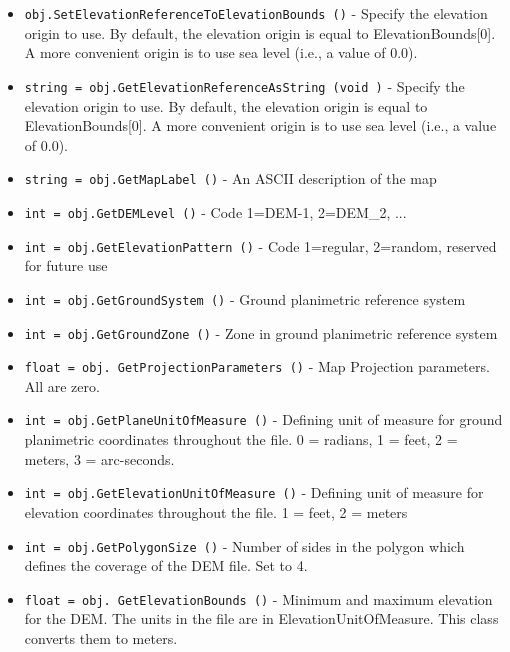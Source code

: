 \begin{itemize}
\item  \verb|obj.SetElevationReferenceToElevationBounds ()| -  Specify the elevation origin to use. By default, the elevation origin
 is equal to ElevationBounds[0]. A more convenient origin is to use sea
 level (i.e., a value of 0.0).

\item  \verb|string = obj.GetElevationReferenceAsString (void )| -  Specify the elevation origin to use. By default, the elevation origin
 is equal to ElevationBounds[0]. A more convenient origin is to use sea
 level (i.e., a value of 0.0).

\item  \verb|string = obj.GetMapLabel ()| -  An ASCII description of the map

\item  \verb|int = obj.GetDEMLevel ()| -  Code 1=DEM-1, 2=DEM\_2, ...

\item  \verb|int = obj.GetElevationPattern ()| -  Code 1=regular, 2=random, reserved for future use

\item  \verb|int = obj.GetGroundSystem ()| -  Ground planimetric reference system

\item  \verb|int = obj.GetGroundZone ()| -  Zone in ground planimetric reference system

\item  \verb|float = obj. GetProjectionParameters ()| -  Map Projection parameters. All are zero.

\item  \verb|int = obj.GetPlaneUnitOfMeasure ()| -  Defining unit of measure for ground planimetric coordinates throughout
 the file. 0 = radians, 1 = feet, 2 = meters, 3 = arc-seconds.

\item  \verb|int = obj.GetElevationUnitOfMeasure ()| -  Defining unit of measure for elevation coordinates throughout
 the file. 1 = feet, 2 = meters

\item  \verb|int = obj.GetPolygonSize ()| -  Number of sides in the polygon which defines the coverage of
 the DEM file. Set to 4.

\item  \verb|float = obj. GetElevationBounds ()| -  Minimum and maximum elevation for the DEM. The units in the file
 are in ElevationUnitOfMeasure. This class converts them to meters.


\end{itemize}
